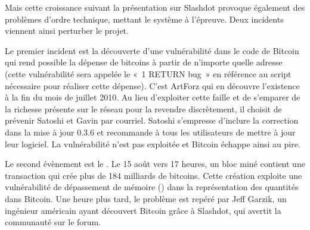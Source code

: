 
Mais cette croissance suivant la présentation sur Slashdot provoque également des problèmes d'ordre technique, mettant le système à l'épreuve. Deux incidents viennent ainsi perturber le projet.

Le premier incident est la découverte d'une vulnérabilité dans le code de Bitcoin qui rend possible la dépense de bitcoins à partir de n'importe quelle adresse (cette vulnérabilité sera appelée le «~1 RETURN bug~» en référence au script nécessaire pour réaliser cette dépense). C'est ArtForz qui en découvre l'existence à la fin du mois de juillet 2010. Au lieu d'exploiter cette faille et de s'emparer de la richesse présente sur le réseau pour la revendre discrètement, il choisit de prévenir Satoshi et Gavin par courriel. Satoshi s'empresse d'inclure la correction dans la mise à jour 0.3.6 et recommande à tous les utilisateurs de mettre à jour leur logiciel. La vulnérabilité n'est pas exploitée et Bitcoin échappe ainsi au pire.

Le second évènement est le . Le 15 août vers 17 heures, un bloc miné contient une transaction qui crée plus de 184 milliards de bitcoins. Cette création exploite une vulnérabilité de dépassement de mémoire () dans la représentation des quantités dans Bitcoin. Une heure plus tard, le problème est repéré par Jeff Garzik, un ingénieur américain ayant découvert Bitcoin grâce à Slashdot, qui avertit la communauté sur le forum.

